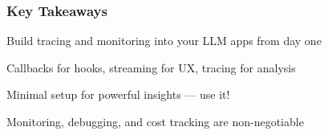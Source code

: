 \documentclass[aspectratio=169,11pt]{beamer}
\begin{document}
\begin{frame}
  \frametitle{Key Takeaways}

  \begin{conceptbox}
    Build tracing and monitoring into your LLM apps from day one
  \end{conceptbox}

  \vspace{0.2cm}

  \begin{conceptbox}
    Callbacks for hooks, streaming for UX, tracing for analysis
  \end{conceptbox}

  \vspace{0.2cm}

  \begin{conceptbox}[3. LangSmith = Free Observability]
    Minimal setup for powerful insights — use it!
  \end{conceptbox}

  \vspace{0.2cm}

  \begin{conceptbox}
    Monitoring, debugging, and cost tracking are non-negotiable
  \end{conceptbox}
\end{frame}

\end{document}
